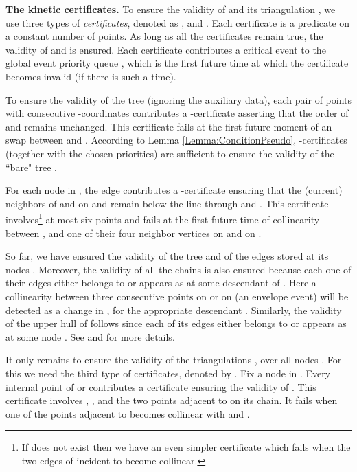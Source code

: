 \documentclass[11pt]{article}
\begin{document}
\medskip
\noindent
{\bf The kinetic certificates.}
To ensure the validity of  and its triangulation ,
we use three types of \textit{certificates}, denoted as ,  and
. Each certificate is a  predicate on  a constant number of
points.  As long as all the certificates remain true, the validity of
 and  is ensured.  Each certificate contributes a
critical event to the global event priority queue , which is the first
future time at which the certificate becomes invalid (if there is such a
time).

\smallskip
{} To ensure the validity of the tree
 (ignoring the auxiliary data), each pair of points  with consecutive -coordinates contributes a -certificate
asserting that the order of  and  remains unchanged.
This certificate fails at the first future moment of an -swap between  and .
According to Lemma \ref{Lemma:ConditionPseudo}, -certificates (together with the chosen priorities) are
sufficient to ensure the validity of the ``bare" tree .

\smallskip
{} 
For each node  in , the edge   contributes a
-certificate ensuring that the (current) neighbors of  and 
on  and 
remain below the line through  and .  This certificate
involves\footnote{\small If  does not exist then we have an
  even simpler certificate which fails when the two edges of
   incident to  become
  collinear.} at most six points and fails at the first future time of
collinearity between , and one of their four neighbor vertices on
 and on .

So far, we have ensured the validity of the tree  and of the edges  stored at its nodes . Moreover, the validity of all the chains  is also ensured because each one of their edges either belongs to  or appears as  at some descendant  of . Here a collinearity between three consecutive points on  or on  (an envelope event) will be detected as a change in , for the appropriate descendant . 
Similarly, the validity of the upper hull of  follows since each of its edges either belongs to  or appears as  at some node .
See \cite{AKS} and \cite{Overmars} for more details.

\smallskip
{}
It only remains to ensure the validity of the triangulations , over all nodes
. For this we need the third type of certificates, denoted by
.  Fix a node  in . Every internal point  of
 or  contributes a  certificate ensuring
the validity of . This certificate involves , , and 
the two points adjacent to 
  on its chain. It fails when one
of the points adjacent to
  becomes collinear with  and .
\end{document}
